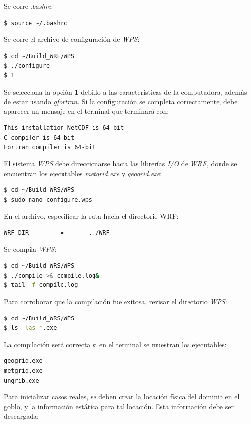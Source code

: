 \documentclass[12pt,letter]{article}
\begin{document}
\noindent Se corre \textit{.bashrc}:
\begin{lstlisting}[language=bash]
$ source ~/.bashrc
\end{lstlisting}

\noindent Se corre el archivo de configuraci\'on de \textit{WPS}:
\begin{lstlisting}[language=bash]
$ cd ~/Build_WRF/WPS
$ ./configure
$ 1
\end{lstlisting}

\noindent Se selecciona la opci\'on \textbf{1} debido a las caracter\'isticas de la computadora, adem\'as de estar usando \textit{gfortran}. Si la configuraci\'on se completa correctamente, debe aparecer un mensaje en el terminal que terminar\'a con:

\begin{lstlisting}
This installation NetCDF is 64-bit
C compiler is 64-bit
Fortran compiler is 64-bit
\end{lstlisting}

\noindent El sistema \textit{WPS} debe direccionarse hacia las librer\'ias \textit{I/O} de \textit{WRF}, donde se encuentran los ejecutables \textit{metgrid.exe} y \textit{geogrid.exe}:

\begin{lstlisting}[language=bash]
$ cd ~/Build_WRS/WPS
$ sudo nano configure.wps
\end{lstlisting}
En el archivo, especificar la ruta hacia el directorio WRF:
\begin{lstlisting}[language=bash]
   WRF_DIR         =       ../WRF
\end{lstlisting}

\noindent Se compila \textit{WPS}:
\begin{lstlisting}[language=bash]
$ cd ~/Build_WRS/WPS
$ ./compile >& compile.log&
$ tail -f compile.log
\end{lstlisting}

\noindent Para corroborar que la compilaci\'on fue exitosa, revisar el directorio \textit{WPS}:
\begin{lstlisting}[language=bash]
$ cd ~/Build_WRS/WPS
$ ls -las *.exe
\end{lstlisting}

\noindent La compilaci\'on ser\'a correcta si en el terminal se muestran los ejecutables:
\begin{lstlisting}[language=bash]
geogrid.exe
metgrid.exe
ungrib.exe
\end{lstlisting}

\noindent Para inicializar casos reales, se deben crear la locaci\'on f\'isica del dominio en el goblo, y la informaci\'on est\'atica para tal locaci\'on. Esta informaci\'on debe ser descargada:
\end{document}
